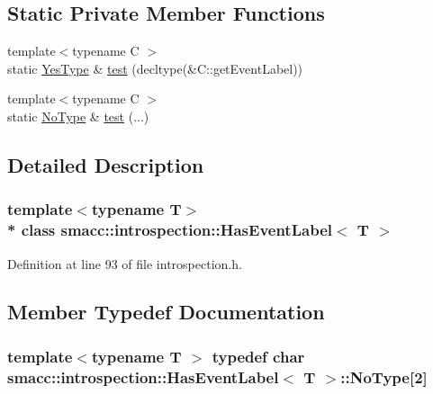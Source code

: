 \subsection*{Static Private Member Functions}
\begin{DoxyCompactItemize}
\item 
{\footnotesize template$<$typename C $>$ }\\static \hyperlink{classsmacc_1_1introspection_1_1HasEventLabel_a8d4b4c2ecb640812e11e8c1407636b6a}{Yes\+Type} \& \hyperlink{classsmacc_1_1introspection_1_1HasEventLabel_ae3239e0c7cf38f2c4f3d3210d5e418a2}{test} (decltype(\&C\+::get\+Event\+Label))
\item 
{\footnotesize template$<$typename C $>$ }\\static \hyperlink{classsmacc_1_1introspection_1_1HasEventLabel_a91b6dd8a7c59c7f24ef0937c99026e81}{No\+Type} \& \hyperlink{classsmacc_1_1introspection_1_1HasEventLabel_a8b29e9cf519f2adf6c0e8634cae63261}{test} (...)
\end{DoxyCompactItemize}


\subsection{Detailed Description}
\subsubsection*{template$<$typename T$>$\\*
class smacc\+::introspection\+::\+Has\+Event\+Label$<$ T $>$}



Definition at line 93 of file introspection.\+h.



\subsection{Member Typedef Documentation}
\subsubsection[{\texorpdfstring{No\+Type}{NoType}}]{\setlength{\rightskip}{0pt plus 5cm}template$<$typename T $>$ typedef char {\bf smacc\+::introspection\+::\+Has\+Event\+Label}$<$ T $>$\+::No\+Type\mbox{[}2\mbox{]}\hspace{0.3cm}{\ttfamily [private]}}\hypertarget{classsmacc_1_1introspection_1_1HasEventLabel_a91b6dd8a7c59c7f24ef0937c99026e81}{}\label{classsmacc_1_1introspection_1_1HasEventLabel_a91b6dd8a7c59c7f24ef0937c99026e81}


